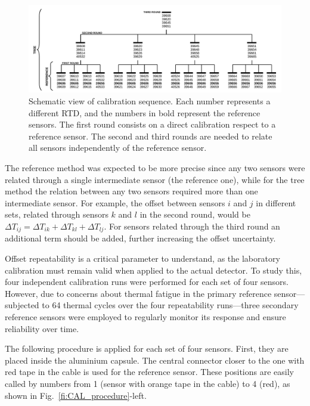 \begin{figure}[htbp]
\centering
\includegraphics[width=\textwidth]{./figure_7.pdf}
\caption{Schematic view of calibration sequence. Each number represents a different RTD, and the numbers in bold represent the reference sensors. The first round consists on a direct calibration respect to a reference sensor. The second and third rounds are needed to relate all sensors independently of the reference sensor.
\label{fi:CAL_sequence}}
\end{figure}

The reference method was expected to be more precise since any two sensors were related through a single intermediate sensor (the reference one), while for the tree method the relation between any two sensors required more than one intermediate sensor. For example, the offset between sensors $i$ and $j$ in different sets, related through sensors $k$ and $l$ in the second round, would be $\Delta T_{ij} = \Delta T_{ik} + \Delta T_{kl} + \Delta T_{lj}$. For sensors related through the third round an additional term should be added, further increasing the offset uncertainty.

Offset repeatability is a critical parameter to understand, as the laboratory calibration must remain valid when applied to the actual detector. To study this, four independent calibration runs were performed for each set of four sensors. However, due to concerns about thermal fatigue in the primary reference sensor---subjected to 64 thermal cycles over the four repeatability runs---three secondary reference sensors were employed to regularly monitor its response and ensure reliability over time.

The following procedure is applied for each set of four sensors. First, they are placed inside the aluminium capsule. The central connector closer to the one with red tape in the cable is used for the reference sensor. These positions are easily called by numbers from 1 (sensor with orange tape in the cable) to 4 (red), as shown in Fig.~\ref{fi:CAL_procedure}-left.


